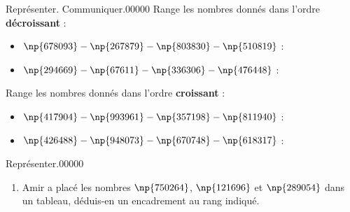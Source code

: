 \begin{pageAD}  %
\restoregeometry %


\begin{ExoCadN}{Représenter. Communiquer.}{0}{0}{0}{0}{0}
Range les nombres donnés dans l'ordre \textbf{décroissant} :
\begin{itemize}
\item $\np{678093}-\np{267879}-\np{803830}-\np{510819}$ :

\item $\np{294669}-\np{67611}-\np{336306}-\np{476448}$ :

\end{itemize}
Range les nombres donnés dans l'ordre \textbf{croissant} :
\begin{itemize}
\item $\np{417904}-\np{993961}-\np{357198}-\np{811940}$ :

\item $\np{426488}-\np{948073}-\np{670748}-\np{618317}$ :

\end{itemize}
\end{ExoCadN}


\begin{ExoCadN}{Représenter.}{0}{0}{0}{0}{0}
\begin{enumerate}
\item Amir a placé les nombres $\np{750264}$, $\np{121696}$ et $\np{289054}$ dans un tableau, déduis-en un encadrement au rang indiqué.


\end{enumerate}
\end{ExoCadN}
\end{pageAD}
